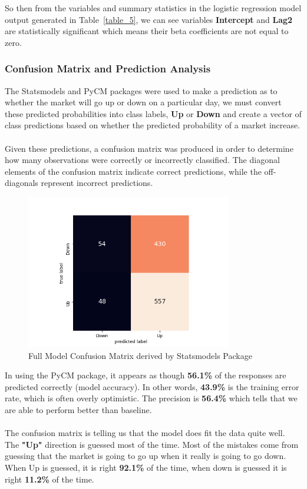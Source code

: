 \documentclass[12pt]{article}
\begin{document}
So then from the variables and summary statistics in the logistic regression model output generated in Table~\ref{table_5}, we can see variables \textbf{Intercept} and \textbf{Lag2} are statistically significant which means their beta coefficients are not equal to zero. 

\subsubsection{Confusion Matrix and Prediction Analysis}
The Statsmodels and PyCM packages were used to make a prediction as to whether the market will go up or down on a particular day, we must convert these predicted probabilities
into class labels, \textbf{Up} or \textbf{Down} and create a vector of class predictions based on whether the predicted probability of a market increase.\\\\
Given these predictions, a confusion matrix was produced in order to determine how many observations were correctly or incorrectly classified. The diagonal elements of the confusion matrix indicate correct predictions, while the off-diagonals represent incorrect predictions.

\newpage

\begin{figure}[!htbp]
	\centering
	\includegraphics[width=9cm]{fullmodel.png}
	\caption{Full Model Confusion Matrix derived by Statsmodels Package}
\label{fig_3}
\end{figure} 


In using the PyCM package, it appears as though \textbf{56.1\%} of the responses are predicted correctly (model accuracy). In other words, \textbf{43.9\%} is the training error rate, which is often overly optimistic. The precision is \textbf{56.4\%} which tells that we are able to perform better than baseline.\\\\
The confusion matrix is telling us that the model does fit the data quite well. The \textbf{"Up"} direction is guessed most of the time. Most of the mistakes come from guessing that the market is going to go up when it really is going to go down. When Up is guessed, it is right \textbf{92.1\%} of the time, when down is guessed it is right \textbf{11.2\%} of the time.
\end{document}
